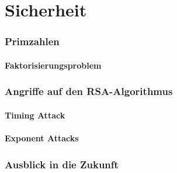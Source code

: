 \part{Sicherheit}
\section{Primzahlen}
\subsection{Faktorisierungsproblem}
\section{Angriffe auf den RSA-Algorithmus}
\subsection{Timing Attack}
\subsection{Exponent Attacks}
\section{Ausblick in die Zukunft}
